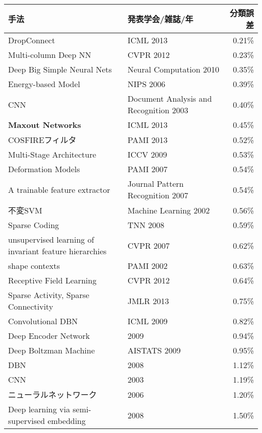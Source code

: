     \begin{tabular}{|p{7cm}|p{5cm}|r|}\hline
    手法 & 発表学会/雑誌/年 & 分類誤差 \\ \hline
    DropConnect \cite{wan2013regularization}& ICML 2013 & 0.21\% \\ \hline
    Multi-column Deep NN \cite{ciresan2012multi-column}& CVPR 2012 & 0.23\% \\ \hline
    Deep Big Simple Neural Nets \cite{ciresan2010deep}& Neural Computation 2010 & 0.35\% \\ \hline
    Energy-based Model\cite{ranzato2006efficient}& NIPS 2006 & 0.39\% \\ \hline
    CNN \cite{simard2003best}& Document Analysis and Recognition 2003 & 0.40\% \\ \hline
    \textbf{Maxout Networks} \cite{goodfellow2013maxout}& ICML 2013 & 0.45\% \\ \hline
    COSFIREフィルタ \cite{azzopardi2013trainable}& PAMI 2013 & 0.52\% \\ \hline
    Multi-Stage Architecture \cite{jarrett2009what}& ICCV 2009 & 0.53\% \\ \hline
    Deformation Models \cite{keysers2007deformation}& PAMI 2007 & 0.54\% \\ \hline
    A trainable feature extractor \cite{lauer2007a-trainable}& Journal Pattern Recognition 2007   & 0.54\% \\ \hline
    不変SVM \cite{decoste2002training}& Machine Learning 2002 & 0.56\% \\ \hline
    Sparse Coding \cite{labusch2008simple}& TNN 2008 & 0.59\% \\ \hline
    unsupervised learning of invariant feature hierarchies \cite{ranzato2007unsupervised}& CVPR 2007 & 0.62\% \\ \hline
    shape contexts \cite{belongie2002shape}& PAMI 2002 & 0.63\% \\ \hline
    Receptive Field Learning \cite{jia2012beyond}& CVPR 2012 & 0.64\% \\ \hline
    Sparse Activity, Sparse Connectivity \cite{thom2013sparse}& JMLR 2013 & 0.75\% \\ \hline
    Convolutional DBN \cite{lee2009convolutional}& ICML 2009 & 0.82\% \\ \hline
    Deep Encoder Network \cite{min2009large-margin}& 2009 & 0.94\% \\ \hline
    Deep Boltzman Machine \cite{salakhutdinov2009deep}& AISTATS 2009 & 0.95\% \\ \hline
    DBN \cite{dahl2008cs81:}& 2008 & 1.12\% \\ \hline
    CNN  \cite{simard2003best}& 2003 & 1.19\% \\ \hline
    ニューラルネットワーク \cite{hinton2006reducing}& 2006 & 1.20\% \\ \hline
    Deep learning via semi-supervised embedding \cite{weston2012deep}& 2008 & 1.50\% \\ \hline
    \end{tabular}%
